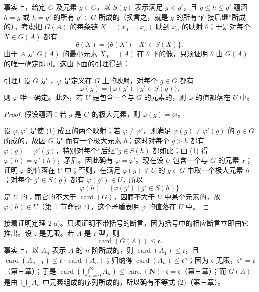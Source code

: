 事实上，给定 $G$ 及元素 $g\in G$，以 $S(g)$ 表示满足 $g<g'$，且 $g\leq h\leq g'$ 蕴涵 $h=g$ 或 $h=g'$ 的所有 $g'\in G$ 所成的（换言之，就是 $g$ 的所有“直接后继”所成的）。考虑把 $G(A)$ 的每条链 $X=(x_0,\ldots,x_n)$ 映到 $x_n$ 的映射 $\theta$；于是对每个 $X\in G(A)$ 都有
\[
 \theta(X)=\{\theta(X')\mid X'\in S(X)\}.
\]
由于 $A$ 是 $G(A)$ 的最小元素 $X_0=(A)$ 在 $\theta$ 下的像，只须证明 $\theta$ 由 $G(A)$ 的唯一确定即可。这由下面的引理得到：
\begin{SGAresult}{引理}{1}
设 $G$ 是 ，$\varphi$ 是定义在 $G$ 上的映射，对每个 $g\in G$ 都有
\[
 \varphi(g)=\{\varphi(g')\mid g'\in S(g)\}. \tag{1}
\]
则 $\varphi$ 唯一确定。此外，若 $U$ 是包含一个与 $G$ 的元素的，则 $\varphi$ 的值都落在 $U$ 中。
\end{SGAresult}
\begin{proof}
假设蕴涵：若 $g$ 是 $G$ 的极大元素，则 $\varphi(g)=\varnothing$。

设 $\varphi,\varphi'$ 是使 (1) 成立的两个映射；若 $\varphi\ne\varphi'$，则满足 $\varphi(g)\ne\varphi'(g)$ 的 $g\in G$ 所成的，故因 $G$ 是 而有一个极大元素 $h$；这时对每个 $g>h$ 都有 $\varphi(g)=\varphi'(g)$，特别对每个“后继”$g\in S(h)$ 都如此；由 (1) 得 $\varphi(h)=\varphi'(h)$，矛盾。因此确有 $\varphi=\varphi'$。现在设 $U$ 包含一个与 $G$ 的元素 $x$；证明 $\varphi$ 的值落在 $U$ 中；否则，在满足 $\varphi(g)\notin U$ 的 $g\in G$ 中取一个极大元素 $h$；对每个 $g'\in S(g)$ 都有 $\varphi(g')\in U$，所以
\[
 \varphi(h)=\{\varphi(g')\mid g'\in S(h)\}
\]
是 $U$ 的；而它的不大于 $\operatorname{card}(G)$，因而不大于 $U$ 中某个元素的，故 $\varphi(h)\in U$（第 1 节命题 7）。这个矛盾表明 $\varphi$ 的值落在 $U$ 中。
\end{proof}
接着证明定理 2 a)。只须证明不带括号的断言，因为括号中的相应断言立即由它推出。设 $\mathfrak{c}$ 是无限。若 $A$ 是 $\mathfrak{c}$ 型，则
\[
 \operatorname{card}(G(A))\leq\mathfrak{c}. \tag{2}
\]
事实上，以 $A_n$ 表示 $A$ 的 $n$ 阶所成的，则 $\operatorname{card}(A_1)\leq\mathfrak{c}$，且 $\operatorname{card}(A_{n+1})\leq\mathfrak{c}\cdot\operatorname{card}(A_n)$；归纳得 $\operatorname{card}(A_n)\leq\mathfrak{c}^n$；因为 $\mathfrak{c}$ 无限，$\mathfrak{c}^n=\mathfrak{c}$（第三章）；于是 $\operatorname{card}(\bigcup_{n=0}^{\infty}A_n)\leq\operatorname{card}(\mathbf N)\cdot\mathfrak{c}=\mathfrak{c}$（第三章）；而 $G(A)$ 是由 $\bigcup_n A_n$ 中元素组成的序列所成的，所以确有不等式 (2)（第三章）。

